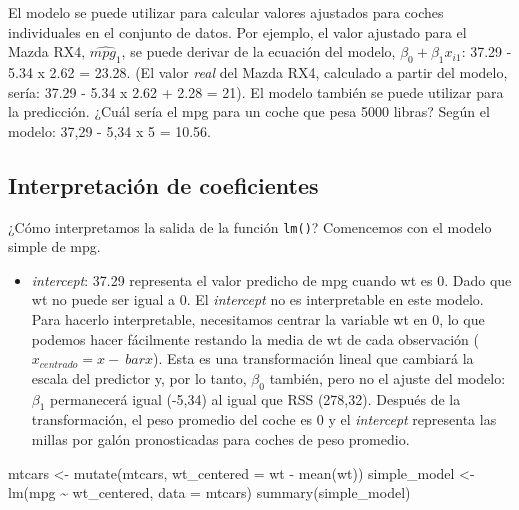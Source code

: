 \documentclass[
]{book}
\newenvironment{Shaded}{\begin{snugshade}}{\end{snugshade}}
\newcommand{\AttributeTok}[1]{\textcolor[rgb]{0.77,0.63,0.00}{#1}}
\newcommand{\FunctionTok}[1]{\textcolor[rgb]{0.00,0.00,0.00}{#1}}
\newcommand{\NormalTok}[1]{#1}
\newcommand{\OtherTok}[1]{\textcolor[rgb]{0.56,0.35,0.01}{#1}}
\newcommand{\SpecialCharTok}[1]{\textcolor[rgb]{0.00,0.00,0.00}{#1}}
\providecommand{\tightlist}{%
  \setlength{\itemsep}{0pt}\setlength{\parskip}{0pt}}
\begin{document}
El modelo se puede utilizar para calcular valores ajustados para coches individuales en el conjunto de datos. Por ejemplo, el valor ajustado para el Mazda RX4, \(\widehat {mpg_1}\), se puede derivar de la ecuación del modelo, \(\beta_0 + \beta_1 x_ {i1}\): 37.29 - 5.34 x 2.62 = 23.28. (El valor \emph{real} del Mazda RX4, calculado a partir del modelo, sería: 37.29 - 5.34 x 2.62 + 2.28 = 21). El modelo también se puede utilizar para la predicción. ¿Cuál sería el mpg para un coche que pesa 5000 libras? Según el modelo: 37,29 - 5,34 x 5 = 10.56.

\hypertarget{interpretaciuxf3n-de-coeficientes}{%
\subsection{Interpretación de coeficientes}\label{interpretaciuxf3n-de-coeficientes}}

¿Cómo interpretamos la salida de la función \texttt{lm()}? Comencemos con el modelo simple de mpg.

\begin{itemize}
\tightlist
\item
  \emph{intercept}: 37.29 representa el valor predicho de mpg cuando wt es 0. Dado que wt no puede ser igual a 0. El \emph{intercept} no es interpretable en este modelo. Para hacerlo interpretable, necesitamos centrar la variable wt en 0, lo que podemos hacer fácilmente restando la media de wt de cada observación (\(x_ {centrado} = x - \ bar {x}\)). Esta es una transformación lineal que cambiará la escala del predictor y, por lo tanto, \(\beta_0\) también, pero no el ajuste del modelo: \(\beta_1\) permanecerá igual (-5,34) al igual que RSS (278,32). Después de la transformación, el peso promedio del coche es 0 y el \emph{intercept} representa las millas por galón pronosticadas para coches de peso promedio.
\end{itemize}

\begin{Shaded}
\begin{Highlighting}[]
\NormalTok{mtcars }\OtherTok{\textless{}{-}} \FunctionTok{mutate}\NormalTok{(mtcars, }\AttributeTok{wt\_centered =}\NormalTok{ wt }\SpecialCharTok{{-}} \FunctionTok{mean}\NormalTok{(wt))}
\NormalTok{simple\_model }\OtherTok{\textless{}{-}} \FunctionTok{lm}\NormalTok{(mpg }\SpecialCharTok{\textasciitilde{}}\NormalTok{ wt\_centered, }\AttributeTok{data =}\NormalTok{ mtcars)}
\FunctionTok{summary}\NormalTok{(simple\_model)}
\end{Highlighting}
\end{Shaded}
\end{document}
